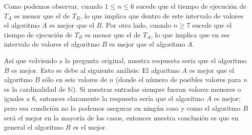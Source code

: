 \documentclass[letterpaper,11pt]{article}
\begin{document}
\begin{enumerate}
    Como podemos observar, cuando $1 \leq n \leq 6$ sucede que el tiempo de 
    ejecución de $T_A$ es menor que el de $T_B$, lo que implica que dentro de 
    este intervalo de valores el algoritmo $A$ es mejor que el $B$. Por otro 
    lado, cuando $n \geq 7$ sucede que el tiempo de ejecución de $T_B$ es menor 
    que el de $T_A$, lo que implica que en ese intervalo de valores el 
    algoritmo $B$ es mejor que el algoritmo $A$. 

    Así que volviendo a la pregunta original, nuestra respuesta sería que el 
    algoritmo $B$ es mejor. Esto se debe al siguiente análisis: El algoritmo 
    $A$ es mejor que el algoritmo $B$ sólo en seis valores de $n$ (donde el 
    número de posibles valores para $n$ es la cardinalidad de $\mathbb{N}$). 
    Si nuestras entradas siempre fueran valores menores o iguales a $6$, 
    entonces claramente la respuesta sería que el algoritmo $A$ es mejor; pero 
    esa condición no la podemos asegurar en ningún caso y como el algoritmo $B$ 
    será el mejor en la mayoría de los casos, entonces nuestra conclusión es que 
    en general el algoritmo $B$ es el mejor. 
\end{enumerate}
\end{document}
